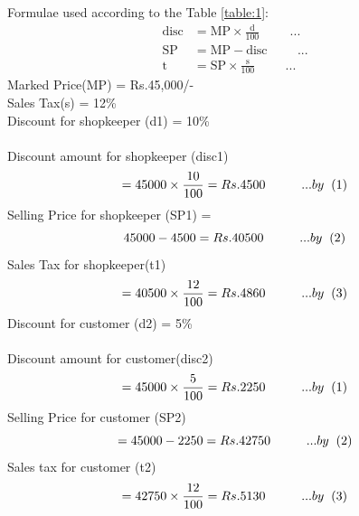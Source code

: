 \documentclass[journal,12pt,two column]{IEEEtran}
\begin{document}
Formulae used according to the Table \ref{table:1}:\\
\begin{align}
  \text{disc} &= \text{MP}\times\frac{\text{d}}{100}\hspace{1cm}...\\ 
  \text{SP} &= \text{MP} - \text{disc} \hspace{1cm}...\\ 
  \text{t} &= \text{SP}\times\frac{\text{s}}{100}\hspace{1cm}...
\end{align}
Marked  Price(MP) = Rs.45,000/- \\
Sales  Tax(s) = 12\% \\
Discount  for  shopkeeper (d1) = 10\% \\ \\
Discount  amount for shopkeeper (disc1)   \begin{equation*}
    = 45000\times\frac{10}{100} = Rs.4500 \hspace{1cm}... by \hspace{0.2cm} (1) 
    \end{equation*} 
Selling Price for shopkeeper (SP1) = \begin{equation*}
    45000 - 4500 = Rs.40500 \hspace{1cm}... by \hspace{0.2cm} (2)
\end{equation*}
Sales Tax for shopkeeper(t1)  \begin{equation*} 
    = 40500\times\frac{12}{100} =  Rs.4860 \hspace{1cm}... by \hspace{0.2cm} (3)
\end{equation*}
Discount for customer (d2) = 5\% \\ \\
Discount amount for customer(disc2)  
\begin{equation*} 
    =  45000\times\frac{5}{100} = Rs.2250 \hspace{1cm}... by \hspace{0.2cm} (1)
    \end{equation*}
Selling Price for customer (SP2)  \begin{equation*}
   = 45000 - 2250 =  Rs.42750 \hspace{1cm}... by \hspace{0.2cm} (2) 
\end{equation*}
Sales tax for customer (t2)  \begin{equation*}
   = 42750\times\frac{12}{100} = Rs.5130 \hspace{1cm}... by \hspace{0.2cm} (3)
\end{equation*} 
\end{document}
